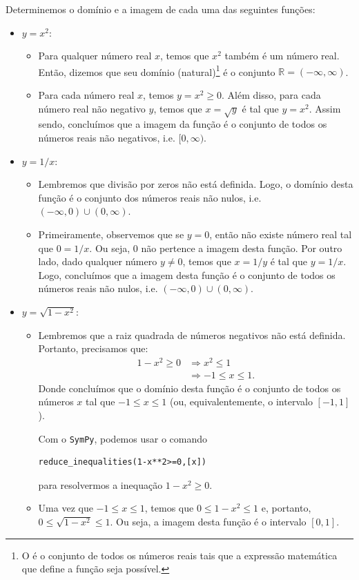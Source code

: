 \begin{ex}
  Determinemos o domínio e a imagem de cada uma das seguintes funções:
  \begin{itemize}
  \item $y=x^2$:
    \begin{itemize}
    \item Para qualquer número real $x$, temos que $x^2$ também é um número real. Então, dizemos que seu domínio (natural)\footnote{O  é o conjunto de todos os números reais tais que a expressão matemática que define a função seja possível.} é o conjunto $\mathbb{R} = (-\infty, \infty)$.
    \item Para cada número real $x$, temos $y=x^2\geq0$. Além disso, para cada número real não negativo $y$, temos que $x=\sqrt{y}$ é tal que $y=x^2$. Assim sendo, concluímos que a imagem da função é o conjunto de todos os números reais não negativos, i.e. $[0, \infty)$.
    \end{itemize}
  \item $y=1/x$:
    \begin{itemize}
    \item Lembremos que divisão por zeros não está definida. Logo, o domínio desta função é o conjunto dos números reais não nulos, i.e. $(-\infty, 0)\cup (0, \infty)$.
    \item Primeiramente, observemos que se $y=0$, então não existe número real tal que $0=1/x$. Ou seja, $0$ não pertence a imagem desta função. Por outro lado, dado qualquer número $y\neq 0$, temos que $x=1/y$ é tal que $y=1/x$. Logo, concluímos que a imagem desta função é o conjunto de todos os números reais não nulos, i.e. $(-\infty, 0)\cup (0, \infty)$.
    \end{itemize}
  \item $y=\sqrt{1-x^2}$:
    \begin{itemize}
    \item Lembremos que a raiz quadrada de números negativos não está definida. Portanto, precisamos que:
      \begin{align}
        1-x^2\geq 0 &\Rightarrow x^2 \leq 1\\
                    &\Rightarrow -1 \leq x \leq 1.
      \end{align}
      Donde concluímos que o domínio desta função é o conjunto de todos os números $x$ tal que $-1\leq x \leq 1$ (ou, equivalentemente, o intervalo $[-1, 1]$).
      
      \ifispython
      Com o \verb+SymPy+, podemos usar o comando
\begin{verbatim}
reduce_inequalities(1-x**2>=0,[x])
\end{verbatim}
      para resolvermos a inequação $1-x^2\geq 0$.
      \fi
    \item Uma vez que $-1 \leq x \leq 1$, temos que $0 \leq 1-x^2 \leq 1$ e, portanto, $0\leq \sqrt{1-x^2} \leq 1$. Ou seja, a imagem desta função é o intervalo $[0, 1]$.
    \end{itemize}
  \end{itemize}
\end{ex}

